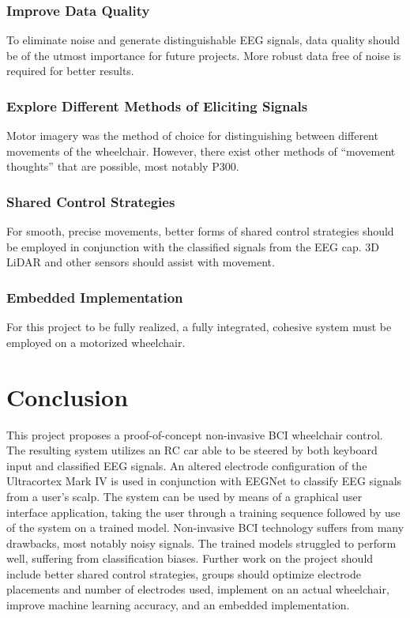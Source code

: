 \documentclass[conference]{IEEEtran}
\begin{document}
        \subsubsection{Improve Data Quality}
        To eliminate noise and generate distinguishable EEG signals, data quality should be of the utmost importance for future projects. More robust data free of noise is required for better results.
        \subsubsection{Explore Different Methods of Eliciting Signals}
        Motor imagery was the method of choice for distinguishing between different movements of the wheelchair. However, there exist other methods of “movement thoughts” that are possible, most notably P300.
        \subsubsection{Shared Control Strategies}
        For smooth, precise movements, better forms of shared control strategies should be employed in conjunction with the classified signals from the EEG cap. 3D LiDAR and other sensors should assist with movement. 
        \subsubsection{Embedded Implementation}
        For this project to be fully realized, a fully integrated, cohesive system must be employed on a motorized wheelchair. 
        
        
    

\section{Conclusion}
This project proposes a proof-of-concept non-invasive BCI wheelchair control. The resulting system utilizes an RC car able to be steered by both keyboard input and classified EEG signals. An altered electrode configuration of the Ultracortex Mark IV is used in conjunction with EEGNet to classify EEG signals from a user’s scalp. The system can be used by means of a graphical user interface application, taking the user through a training sequence followed by use of the system on a trained model. Non-invasive BCI technology suffers from many drawbacks, most notably noisy signals. The trained models struggled to perform well, suffering from classification biases. Further work on the project should include better shared control strategies, groups should optimize electrode placements and number of electrodes used, implement on an actual wheelchair, improve machine learning accuracy, and an embedded implementation. 
    
\end{document}
